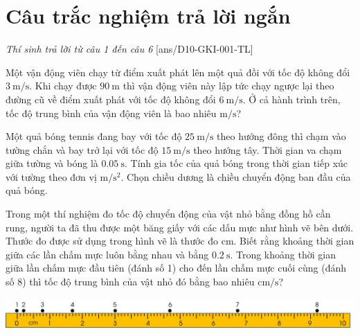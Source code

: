\section{Câu trắc nghiệm trả lời ngắn} \textit{Thí sinh trả lời từ câu 1 đến câu 6}
\setcounter{ex}{0}
[ans/D10-GKI-001-TL]
\begin{ex}
	Một vận động viên chạy từ điểm xuất phát lên một quả đồi với tốc độ không đổi $\SI{3}{\meter/\second}$. Khi chạy được $\SI{90}{\meter}$ thì vận động viên này lập tức chạy ngược lại theo đường cũ về điểm xuất phát với tốc độ không đổi $\SI{6}{\meter/\second}$. Ở cả hành trình trên, tốc độ trung bình của vận động viên là bao nhiêu $\si{\meter/\second}$?
\end{ex}
\begin{ex}
	Một quả bóng tennis đang bay với tốc độ $\SI{25}{\meter/\second}$ theo hướng đông thì chạm vào tường chắn và bay trở lại với tốc độ $\SI{15}{\meter/\second}$ theo hướng tây. Thời gian va chạm giữa tường và bóng là $\SI{0.05}{\second}$. Tính gia tốc của quả bóng trong thời gian tiếp xúc với tường theo đơn vị $\si{\meter/\second^2}$. Chọn chiều dương là chiều chuyển động ban đầu của quả bóng.
	\loigiai{
	}
\end{ex}
\begin{ex}
	Trong một thí nghiệm đo tốc độ chuyển động của vật nhỏ bằng đồng hồ cần rung, người ta đã thu được một băng giấy với các dấu mực như hình vẽ bên dưới. Thước đo được sử dụng trong hình vẽ là thước đo $\si{\centi\meter}$. Biết rằng khoảng thời gian giữa các lần chấm mực luôn bằng nhau và bằng $\SI{0.2}{\second}$. Trong khoảng thời gian giữa lần chấm mực đầu tiên (đánh số 1) cho đến lần chấm mực cuối cùng (đánh số 8) thì tốc độ trung bình của vật nhỏ đó bằng bao nhiêu $\si{\centi\meter/\second}$?	
	\begin{center}
		\includegraphics[width=0.9\linewidth]{../figs/D10-2-15}
	\end{center}
	\loigiai{
		
	}
\end{ex}

